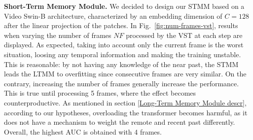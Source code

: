 \noindent\textbf{Short-Term Memory Module.}
\label{Short-Term Memory Module exp}
We decided to design our STMM based on a Video Swin-B architecture, characterized by an embedding dimension of $C = 128$ after the linear projection of the patches. %
In Fig.~\ref{fig:num-frames-vst}, results when varying the number of frames $\mathit{NF}$ processed by the VST at each step are displayed.
As expected, taking into account only the current frame is the worst situation, loosing any temporal information and making the training unstable.
This is reasonable: by not having any knowledge of the near past, the STMM leads the LTMM to overfitting since consecutive frames are very similar.
On the contrary, increasing the number of frames generally increase the performance. 
This is true until processing 5 frames, where the effect becomes counterproductive.
As mentioned in section \ref{Long-Term Memory Module descr}, according to our hypotheses, overloading the transformer becomes harmful, as it does not have a mechanism to weight the remote and recent past differently.
Overall, the highest AUC is obtained with 4 frames.

